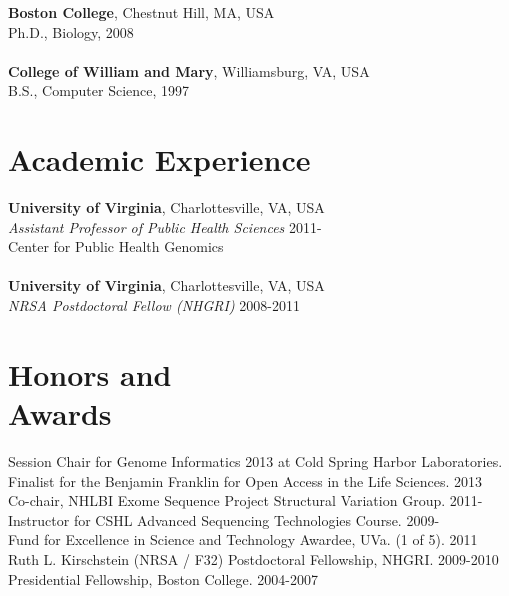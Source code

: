 \documentclass[margin,line]{cv}
\begin{document}
\begin{resume}
    \textbf{Boston College}, Chestnut Hill, MA, USA\\
    Ph.D., Biology, 2008\\
    \\
    \textbf{College of William and Mary}, Williamsburg, VA, USA\\
    B.S., Computer Science, 1997


    \section{\mysidestyle Academic Experience}

    \textbf{University of Virginia}, Charlottesville, VA, USA\\
    \textit{Assistant Professor of Public Health Sciences}                              \hfill 2011-\\
    Center for Public Health Genomics\\
    \\
    \textbf{University of Virginia}, Charlottesville, VA, USA\\
    \textit{NRSA Postdoctoral Fellow (NHGRI)}                                          \hfill 2008-2011\\


    \section{\mysidestyle Honors and\\Awards} 

    Session Chair for Genome Informatics 2013 at Cold Spring Harbor Laboratories. \\\vspace{1mm}%
	Finalist for the Benjamin Franklin for Open Access in the Life Sciences. 2013 \\\vspace{1mm}%
    Co-chair, NHLBI Exome Sequence Project Structural Variation Group. 2011-                           \\\vspace{1mm}%
    Instructor for CSHL Advanced Sequencing Technologies Course. 2009-                                 \\\vspace{1mm}%
    Fund for Excellence in Science and Technology Awardee, UVa. (1 of 5). 2011                         \\\vspace{1mm}%
    Ruth L. Kirschstein (NRSA / F32) Postdoctoral Fellowship, NHGRI. 2009-2010                         \\\vspace{1mm}%
    Presidential Fellowship, Boston College. 2004-2007                                                               %
    

\end{resume}
\end{document}
